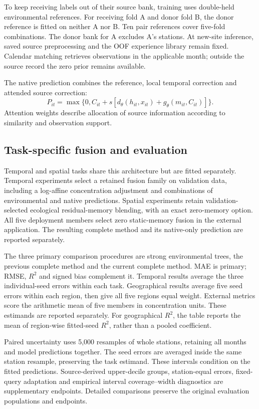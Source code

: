 \documentclass[11pt]{article}
\begin{document}
To keep receiving labels out of their source bank, training uses double-held environmental references. For receiving fold A and donor fold B, the donor reference is fitted on neither A nor B. Ten pair references cover five-fold combinations. The donor bank for A excludes A's stations. At new-site inference, saved source preprocessing and the OOF experience library remain fixed. Calendar matching retrieves observations in the applicable month; outside the source record the zero prior remains available.

The native prediction combines the reference, local temporal correction and attended source correction:
\[
 P_{it}=\max\{0,C_{it}+s[d_\theta(h_{it},x_{it})+g_\theta(m_{it},C_{it})]\}.
\]
Attention weights describe allocation of source information according to similarity and observation support.

\subsection{Task-specific fusion and evaluation}
Temporal and spatial tasks share this architecture but are fitted separately. Temporal experiments select a retained fusion family on validation data, including a log-affine concentration adjustment and combinations of environmental and native predictions. Spatial experiments retain validation-selected ecological residual-memory blending, with an exact zero-memory option. All five deployment members select zero static-memory fusion in the external application. The resulting complete method and its native-only prediction are reported separately.

The three primary comparison procedures are strong environmental trees, the previous complete method and the current complete method. MAE is primary; RMSE, $R^2$ and signed bias complement it. Temporal results average the three individual-seed errors within each task. Geographical results average five seed errors within each region, then give all five regions equal weight. External metrics score the arithmetic mean of five members in concentration units. These estimands are reported separately. For geographical $R^2$, the table reports the mean of region-wise fitted-seed $R^2$, rather than a pooled coefficient.

Paired uncertainty uses 5,000 resamples of whole stations, retaining all months and model predictions together. The seed errors are averaged inside the same station resample, preserving the task estimand. These intervals condition on the fitted predictions. Source-derived upper-decile groups, station-equal errors, fixed-query adaptation and empirical interval coverage--width diagnostics are supplementary endpoints. Detailed comparisons preserve the original evaluation populations and endpoints.
\end{document}
